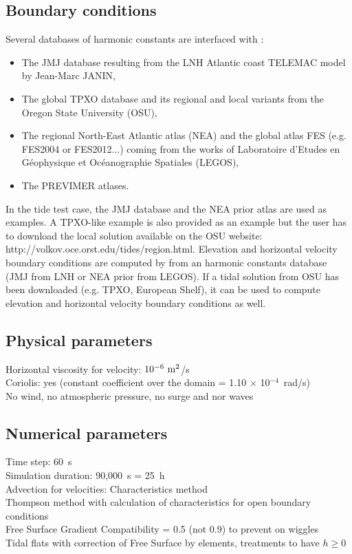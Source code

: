 \subsection{Boundary conditions}
%
Several databases of harmonic constants are interfaced with
:
\begin{itemize}
\item The JMJ database resulting from the LNH Atlantic coast TELEMAC
model by Jean-Marc JANIN,
\item The global TPXO database and its regional and local variants
from the Oregon State University (OSU),
\item The regional North-East Atlantic atlas (NEA) and the global
atlas FES (e.g. FES2004 or FES2012...) coming from the works of
Laboratoire d’Etudes en Géophysique et Océanographie Spatiales (LEGOS),
\item The PREVIMER atlases.
\end{itemize}

In the tide test case, the JMJ database and the NEA prior atlas are
used as examples.
A TPXO-like example is also provided as an example but the user has
to download the local solution available on the OSU website:
http://volkov.oce.orst.edu/tides/region.html.
Elevation and horizontal velocity boundary conditions are computed by
 from an harmonic constants database (JMJ from LNH or
NEA prior from LEGOS). If a tidal solution from OSU has been downloaded (e.g. TPXO, European
Shelf), it can be used to compute elevation and horizontal velocity
boundary conditions as well.

\subsection{Physical parameters}
%
Horizontal viscosity for velocity: $10^{-6}~\rm{m}^2$/s\\
Coriolis: yes (constant coefficient over the domain
= 1.10 $\times$ 10$^{-4}$~rad/s)\\
No wind, no atmospheric pressure, no surge and nor waves

\subsection{Numerical parameters}

Time step: 60~s\\
Simulation duration: 90,000~s = 25~h\\
%
Advection for velocities: Characteristics method\\
Thompson method with calculation of characteristics for open boundary
conditions\\
Free Surface Gradient Compatibility = 0.5 (not 0.9) to prevent on
wiggles\\
Tidal flats with correction of Free Surface by elements, treatments
to have $h \ge 0$
%
